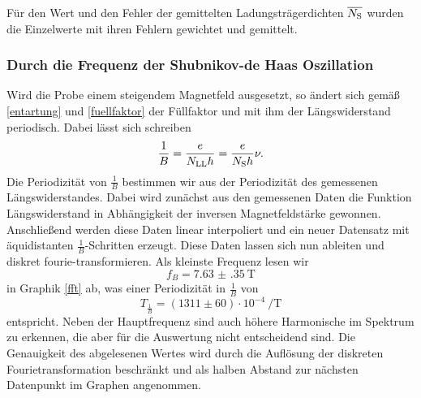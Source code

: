 \documentclass[paper=a4,fontsize=10pt,DIV=18,twocolumn,parskip=half]{scrartcl}
\numberwithin{equation}{section}    %
\newcommand{\kor}[1]{{\color{darkgreen}#1}}
\begin{document}
\kor{Für den Wert und den Fehler der gemittelten Ladungsträgerdichten $\overline{N_{\rm S}}$ wurden die Einzelwerte mit ihren Fehlern gewichtet und gemittelt.}\\

\subsubsection*{Durch die Frequenz der Shubnikov-de Haas Oszillation}
Wird die Probe einem steigendem Magnetfeld ausgesetzt, so ändert sich gemäß \eqref{entartung} und \eqref{fuellfaktor} der Füllfaktor und mit ihm der Längswiderstand periodisch. Dabei lässt sich schreiben
\begin{equation}
\frac{1}{B}=\frac{e}{N_{\rm LL} h}=\frac{e}{N_\mathrm{S} h} \nu.
\end{equation}
Die Periodizität von $\frac{1}{B}$ bestimmen wir aus der Periodizität des gemessenen Längswiderstandes. Dabei wird zunächst aus den gemessenen Daten die Funktion Längswiderstand in Abhängigkeit der inversen Magnetfeldstärke gewonnen. Anschließend werden diese Daten linear interpoliert und ein neuer Datensatz mit äquidistanten $\frac{1}{B}$-Schritten erzeugt. Diese Daten lassen sich nun ableiten und diskret fourie-transformieren. \kor{Als kleinste Frequenz lesen wir 
\begin{equation}
f_{B}=\SI{7.63(35)}{\tesla}
\label{Bfrequenz}
\end{equation}
in Graphik \ref{fft} ab, was einer Periodizität in $\frac{1}{B}$ von
\begin{equation}
T_{\frac{1}{B}}=(1311\pm 60) \cdot 10^{-4}\SI{}{\per\tesla}
\label{periodizitaet}
\end{equation}
entspricht. Neben der Hauptfrequenz sind auch höhere Harmonische im Spektrum zu erkennen, die aber für die Auswertung nicht entscheidend sind.} Die Genauigkeit des abgelesenen Wertes wird durch die Auflösung der diskreten Fourietransformation beschränkt und als halben Abstand zur nächsten Datenpunkt im Graphen angenommen.
\end{document}

